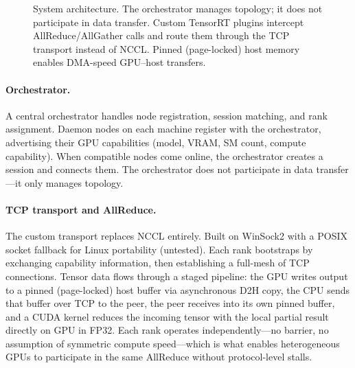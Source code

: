 \documentclass[10pt,twocolumn]{article}
\begin{document}
\begin{figure}[t]
\caption{System architecture.  The orchestrator manages topology; it does
not participate in data transfer.  Custom TensorRT plugins intercept
AllReduce/AllGather calls and route them through the TCP transport instead
of NCCL.  Pinned (page-locked) host memory enables DMA-speed GPU--host
transfers.}
\label{fig:architecture}
\end{figure}

\paragraph{Orchestrator.}
A central orchestrator handles node registration, session matching, and
rank assignment.  Daemon nodes on each machine register with the
orchestrator, advertising their GPU capabilities (model, VRAM, SM count,
compute capability).  When compatible nodes come online, the orchestrator
creates a session and connects them.  The orchestrator does not participate
in data transfer---it only manages topology.

\paragraph{TCP transport and AllReduce.}
The custom transport replaces NCCL entirely.  Built on WinSock2 with a
POSIX socket fallback for Linux portability (untested).  Each rank
bootstraps by exchanging capability information, then establishing a
full-mesh of TCP connections.  Tensor data flows through a staged pipeline:
the GPU writes output to a pinned (page-locked) host buffer via
asynchronous D2H copy, the CPU sends that buffer over TCP to the peer, the
peer receives into its own pinned buffer, and a CUDA kernel reduces the
incoming tensor with the local partial result directly on GPU in FP32.
Each rank operates independently---no barrier, no assumption of symmetric
compute speed---which is what enables heterogeneous GPUs to participate in
the same AllReduce without protocol-level stalls.
\end{document}
